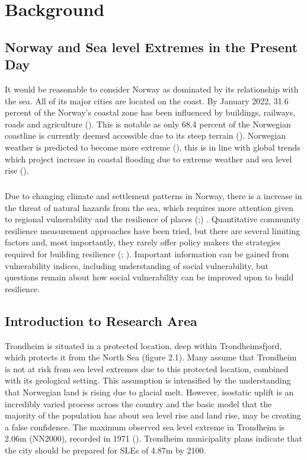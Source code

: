 \chapter{Background}

\section{Norway and Sea level Extremes in the Present Day}
 It would be reasonable to consider Norway as dominated by its relationship with the sea. All of its major cities are located on the coast.  By January 2022, 31.6 percent of the Norway's coastal zone has been influenced by buildings, railways, roads and agriculture (\cite{engebakken_construction_2022}). This is notable as only 68.4 percent of the Norwegian coastline is currently deemed accessible due to its steep terrain (\cite{engebakken_construction_2022}). Norwegian weather is predicted to become more extreme (\cite{rod_integrated_2012}), this is in line with global trends which project increase in coastal flooding due to extreme weather and sea level rise (\cite{hoffken_effects_2020}). 
\paragraph{}

Due to changing climate and settlement patterns in Norway, there is a increase in the threat of natural hazards from the sea, which requires more attention given to regional vulnerability and the resilience of places (\cite{opach_seeking_2020};\cite{rod_three_2015}) . Quantitative community resilience measurement approaches have been tried, but there are several limiting factors and, most importantly, they rarely offer policy makers the strategies required for building resilience (\cite{opach_seeking_2020}; \cite{gerkensmeier_governing_2018}). Important information can be gained from vulnerability indices, including understanding of social vulnerability, but questions remain about how social vulnerability can be improved upon to build resilience. 


\section{Introduction to Research Area}

Trondheim is situated in a protected location, deep within Trondheimsfjord, which protects it from the North Sea (figure 2.1). Many assume that Trondheim is not at risk from sea level extremes due to this protected location, combined with its geological setting. This assumption is intensified by the understanding that Norwegian land is rising due to glacial melt. However, isostatic uplift is an incredibly varied process across the country and the basic model that the majority of the population has about sea level rise and land rise, may be creating a false confidence.  The maximum observed sea level extreme in Trondheim is 2.06m (NN2000), recorded in 1971 (\cite{tides_high_2022}). Trondheim municipality plans indicate that the city should be prepared for SLEs of 4.87m by 2100. 

